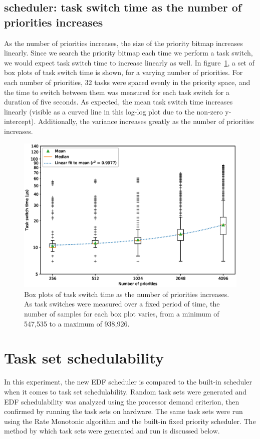 \subsection{\ucosiii scheduler: task switch time as the number of priorities increases}
As the number of priorities increases, the size of the priority bitmap increases linearly. Since we search the priority bitmap each time we perform a task switch, we would expect task switch time to increase linearly as well. In figure~\ref{fig:prioboxplot}, a set of box plots of task switch time is shown, for a varying number of priorities. For each number of priorities, 32 tasks were spaced evenly in the priority space, and the time to switch between them was measured for each task switch for a duration of five seconds. As expected, the mean task switch time increases linearly (visible as a curved line in this log-log plot due to the non-zero y-intercept). Additionally, the variance increases greatly as the number of priorities increases.

\begin{figure}[htpb]
    \centering
    \includegraphics[width=\textwidth]{figures/boxplot.eps}
    \caption{Box plots of task switch time as the number of priorities increases. As task switches were measured over a fixed period of time, the number of samples for each box plot varies, from a minimum of 547,535 to a maximum of 938,926.}
    \label{fig:prioboxplot}
\end{figure}

\section{Task set schedulability}
In this experiment, the new EDF scheduler is compared to the built-in scheduler when it comes to task set schedulability. Random task sets were generated and EDF schedulability was analyzed using the processor demand criterion, then confirmed by running the task sets on hardware. The same task sets were run using the Rate Monotonic algorithm and the built-in fixed priority scheduler. The method by which task sets were generated and run is discussed below.

